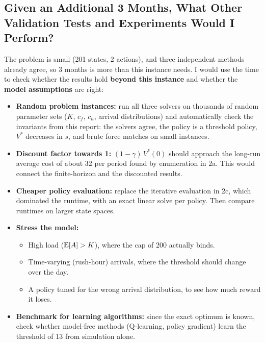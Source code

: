 \subsection{Given an Additional 3 Months, What Other Validation Tests and Experiments Would I Perform?}

The problem is small (201 states, 2 actions), and three independent methods already agree, so 3 months is more than this instance needs. I would use the time to check whether the results hold \textbf{beyond this instance} and whether the \textbf{model assumptions} are right:
\begin{itemize}
  \item \textbf{Random problem instances:} run all three solvers on thousands of random parameter sets ($K$, $c_f$, $c_h$, arrival distributions) and automatically check the invariants from this report: the solvers agree, the policy is a threshold policy, $V^*$ decreases in $s$, and brute force matches on small instances.
  \item \textbf{Discount factor towards 1:} $(1-\gamma)\,V^*(0)$ should approach the long-run average cost of about 32 per period found by enumeration in 2a. This would connect the finite-horizon and the discounted results.
  \item \textbf{Cheaper policy evaluation:} replace the iterative evaluation in 2c, which dominated the runtime, with an exact linear solve per policy. Then compare runtimes on larger state spaces.
  \item \textbf{Stress the model:}
  \begin{itemize}
    \item High load ($\mathbb{E}[A] > K$), where the cap of 200 actually binds.
    \item Time-varying (rush-hour) arrivals, where the threshold should change over the day.
    \item A policy tuned for the wrong arrival distribution, to see how much reward it loses.
  \end{itemize}
  \item \textbf{Benchmark for learning algorithms:} since the exact optimum is known, check whether model-free methods (Q-learning, policy gradient) learn the threshold of 13 from simulation alone.
\end{itemize}
